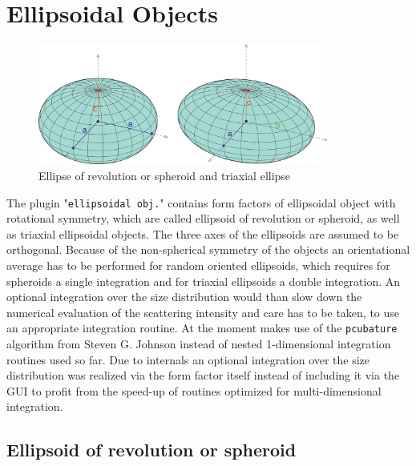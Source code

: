 \clearpage
\section{Ellipsoidal Objects}
\label{sect:EllipsoidalObjects}
\begin{figure}[htb]
\begin{center}
\includegraphics[width=0.85\textwidth]{../images/form_factor/Ellipsoid/Ellipsoide.png}
\end{center}
\caption{Ellipse of revolution or spheroid and triaxial ellipse}
\label{fig:EllipsoidalObjects}
\end{figure}

The plugin "\texttt{ellipsoidal obj.}" contains form factors of ellipsoidal object with rotational symmetry, which are called ellipsoid of revolution or spheroid, as well as triaxial ellipsoidal objects. The three axes of the ellipsoids are assumed to be orthogonal. Because of the non-spherical symmetry of the objects an orientational average has to be performed for random oriented ellipsoids, which requires for spheroids a single integration and for triaxial ellipsoids a double integration. An optional integration over the size distribution would than slow down the numerical evaluation of the scattering intensity and care has to be taken, to use an appropriate integration routine. At the moment \SASfit makes use of the \texttt{pcubature} algorithm from Steven G. Johnson \cite{Johnson} instead of nested 1-dimensional integration routines used so far. Due to \SASfit internals an optional integration over the size distribution was realized via the form factor itself instead of including it via the GUI to profit from the speed-up of routines optimized for multi-dimensional integration.

\subsection{Ellipsoid of revolution or spheroid}
\label{sec:Spheroid}~\\

